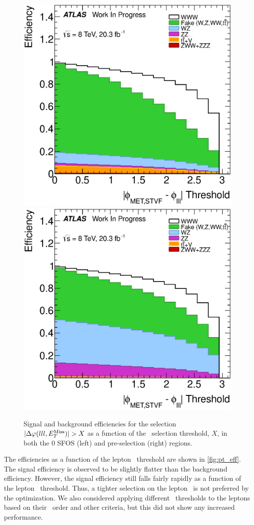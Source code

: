\begin{figure}[ht!]
\centering
\includegraphics[width=0.45\columnwidth]{figures/optimization/SignalRegionsPreselection_0SFOS_Efficiencies/DeltaPhiMETSTVF123_Abs_Cumulative.eps}
\includegraphics[width=0.45\columnwidth]{figures/optimization/SignalRegions_0p5mmZ0_Preselection_Efficiencies/DeltaPhiMETSTVF123_Abs_Cumulative.eps}
\caption{ Signal and background efficiencies 
for the selection
$|\Delta\varphi(lll,E_{T}^{\textrm{Miss}})| > X$
as a function of the \deltaphi~selection
threshold, $X$, in both the 0 SFOS (left) and pre-selection (right) regions.  }
\label{fig:deltaphi_eff}
\end{figure}

The efficiencies as a function of the lepton \pt~threshold are shown 
in \fig\ref{fig:pt_eff}. 
The signal efficiency is observed to be slightly flatter
than the background efficiency.
However, the signal efficiency still falls fairly 
rapidly as a function of the lepton \pt~threshold. 
Thus, a tighter selection on the lepton \pt~is not preferred
by the optimization. We also considered 
applying different \pt~thresholds to the leptons
based on their \pt~order and other criteria, but
this did not show any increased performance.


